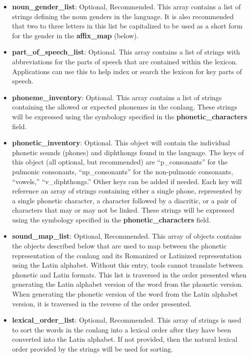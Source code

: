 \begin{itemize}
	\item \textbf{noun\_gender\_list}: Optional, Recommended. This array contains a list of strings defining the noun genders in the language.  It is also recommended that two to three letters in this list be capitalized to be used as a short form for the gender in the \textbf{affix\_map} (below).
	\item \textbf{part\_of\_speech\_list}: Optional.  This array contains a list of strings with abbreviations for the parts of speech that are contained within the lexicon.  Applications can use this to help index or search the lexicon for key parts of speech.
	\item \textbf{phoneme\_inventory}: Optional. This array contains a list of strings containing the allowed or expected phonemes in the conlang.  These strings will be expressed using the symbology specified in the \textbf{phonetic\_characters} field.
	\item \textbf{phonetic\_inventory}: Optional. This object will contain the individual phonetic sounds (phones) and diphthongs found in the language.  The keys of this object (all optional, but recommended) are ``p\_consonants'' for the pulmonic consonants, ``np\_consonants'' for the non-pulmonic consonants, ``vowels,'' ``v\_diphthongs.''  Other keys can be added if needed.  Each key will reference an array of strings containing either a single phone, represented by a single phonetic character, a character followed by a diacritic, or a pair of characters that may or may not be linked.  These strings will be expressed using the symbology specified in the \textbf{phonetic\_characters} field.
	\item \textbf{sound\_map\_list}: Optional, Recommended. This array of objects contains the objects described below that are used to map between the phonetic representation of the conlang and its Romanized or Latinized representation using the Latin alphabet.  Without this entry, tools cannot translate between phonetic and Latin formats.  This list is traversed in the order presented when generating the Latin alphabet version of the word from the phonetic version.  When generating the phonetic version of the word from the Latin alphabet version, it is traversed in the reverse of the order presented.
	\item \textbf{lexical\_order\_list}: Optional, Recommended. This array of strings is used to sort the words in the conlang into a lexical order after they have been converted into the Latin alphabet.  If not provided, then the natural lexical order provided by the strings will be used for sorting.

\end{itemize}
